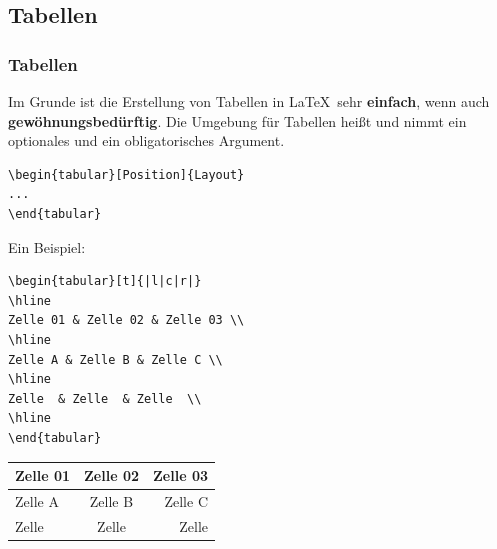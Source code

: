 \subsection{Tabellen}

\begin{frame}[fragile]
\frametitle{Tabellen}

Im Grunde ist die Erstellung von Tabellen in \LaTeX\ sehr \textbf{einfach}, wenn auch \textbf{gewöhnungsbedürftig}. Die Umgebung für Tabellen heißt  und nimmt ein optionales und ein obligatorisches Argument.
\begin{lstlisting}
\begin{tabular}[Position]{Layout}
...    
\end{tabular}
\end{lstlisting}

\pause 

Ein Beispiel:

\begin{multicols}{2}
	
{\scriptsize
\begin{lstlisting}
\begin{tabular}[t]{|l|c|r|}
\hline
Zelle 01 & Zelle 02 & Zelle 03 \\
\hline
Zelle A & Zelle B & Zelle C \\
\hline
Zelle  & Zelle  & Zelle  \\
\hline
\end{tabular}
\end{lstlisting}
}
	
	\columnbreak
	
\begin{tabular}[t]{|l|c|r|}
	\hline
	Zelle 01 & Zelle 02 & Zelle 03 \\
	\hline
	Zelle A & Zelle B & Zelle C \\
	\hline
	Zelle  & Zelle  & Zelle  \\
	\hline
\end{tabular}
\end{multicols}

\end{frame}


